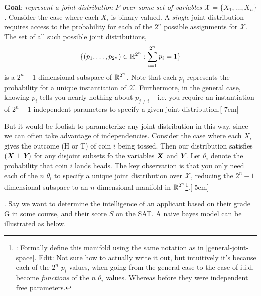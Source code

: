 \documentclass[11pt]{article}
\begin{document}
\p \textbf{Goal}: \textit{represent a joint distribution $P$ over some set of variables $\mathcal{X} = \{X_1, \ldots, X_n\}$.} Consider the case where each $X_i$ is binary-valued. A \textit{single} joint distribution requires access to the probability for each of the $2^n$ possible assignments for $\mathcal{X}$. The set of all such possible joint distributions,
\begin{align}
	\{ (p_1, \ldots, p_{2^n}) \in \mathbb{R}^{2^n} : \sum_{i = 1}^{2^n} p_i = 1   \label{general-joint-space}  \}
\end{align}
is a $2^n - 1$ dimensional subspace of $\mathbb{R}^{2^n}$. Note that each $p_i$ represents the probability for a unique instantiation of $\mathcal{X}$. Furthermore, in the general case, knowing $p_i$ tells you nearly nothing about $p_{j \ne i}$ -- i.e. you require an instantiation of $2^{n} - 1$ independent parameters to specify a given joint distribution.[-7em] 

But it would be foolish to parameterize any joint distribution in this way, since we can often take advantage of independencies. Consider the case where each $X_i$ gives the outcome (H or T) of coin $i$ being tossed. Then our distribution satisfies $(\bm{X}_{} \perp \bm{Y}_{})$ for any disjoint subsets fo the variables $\bm{X}_{}$ and $\bm{Y}_{}$. Let $\theta_i$ denote the probability that coin $i$ lands heads. The key observation is that you only need each of the $n$ $\theta_i$ to specify a unique joint distribution over $\mathcal{X}$, reducing the $2^{n} - 1$ dimensional subspace to an $n$ dimensional manifold in $\mathbb{R}^{2^n}$\footnote{: Formally define this manifold using the same notation as in \ref{general-joint-space}. Edit: Not sure how to actually write it out, but intuitively it's because each of the $2^n$ $p_i$ values, when going from the general case to the case of i.i.d, become \textit{functions} of the $n$ $\theta_i$ values. Whereas before they were independent free parameters.}.[-5em] 


\myspace
\p {}. Say we want to determine the intelligence of an applicant based on their grade G in some course, and their score $S$ on the SAT. A naive bayes model can be illustrated as below. 
\end{document}
